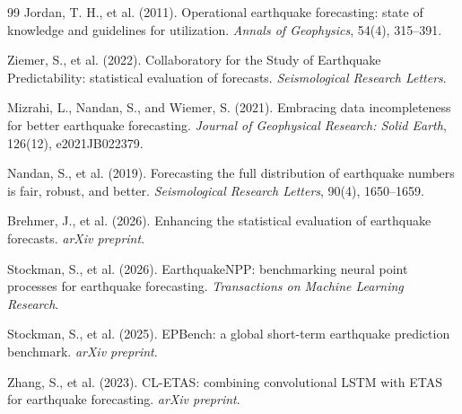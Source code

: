 \documentclass[11pt,a4paper]{article}
\begin{document}
\begin{thebibliography}{99}
 Jordan, T. H., et al. (2011). Operational earthquake
forecasting: state of knowledge and guidelines for utilization. \emph{Annals
of Geophysics}, 54(4), 315--391.

 Ziemer, S., et al. (2022). Collaboratory for the Study
of Earthquake Predictability: statistical evaluation of forecasts.
\emph{Seismological Research Letters}.

 Mizrahi, L., Nandan, S., and Wiemer, S. (2021).
Embracing data incompleteness for better earthquake forecasting.
\emph{Journal of Geophysical Research: Solid Earth}, 126(12),
e2021JB022379.

 Nandan, S., et al. (2019). Forecasting the full
distribution of earthquake numbers is fair, robust, and better.
\emph{Seismological Research Letters}, 90(4), 1650--1659.

 Brehmer, J., et al. (2026). Enhancing the statistical
evaluation of earthquake forecasts. \emph{arXiv preprint}.

 Stockman, S., et al. (2026). EarthquakeNPP:
benchmarking neural point processes for earthquake forecasting.
\emph{Transactions on Machine Learning Research}.

 Stockman, S., et al. (2025). EPBench: a global
short-term earthquake prediction benchmark. \emph{arXiv preprint}.

 Zhang, S., et al. (2023). CL-ETAS: combining
convolutional LSTM with ETAS for earthquake forecasting. \emph{arXiv
preprint}.

\end{thebibliography}
\end{document}
